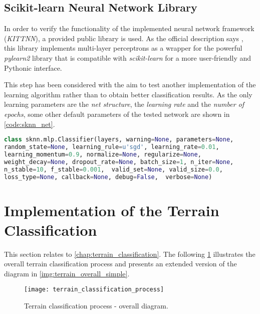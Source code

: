 \subsection*{Scikit-learn Neural Network Library} \label{ssec:sknn}
In order to verify the functionality of the implemented neural network framework (\textit{KITTNN}), a provided public library is used. As the official description says \citep{misc:sknn}, this library implements multi-layer perceptrons as a wrapper for the powerful \textit{pylearn2} library that is compatible with \textit{scikit-learn} for a more user-friendly and Pythonic interface.

This step has been considered with the aim to test another implementation of the learning algorithm rather than to obtain better classification results. As the only learning parameters are the \textit{net structure}, the \textit{learning rate} and the \textit{number of epochs}, some other default parameters of the tested network are shown in \cref{code:sknn_net}.

\begin{lstlisting}[language=Python, caption={SKNN classifier specification \citep{misc:sknn}}, label=code:sknn_net]
class sknn.mlp.Classifier(layers, warning=None, parameters=None, 
random_state=None, learning_rule=u'sgd', learning_rate=0.01, 
learning_momentum=0.9, normalize=None, regularize=None, 
weight_decay=None, dropout_rate=None, batch_size=1, n_iter=None, 
n_stable=10, f_stable=0.001,  valid_set=None, valid_size=0.0, 
loss_type=None, callback=None, debug=False,  verbose=None)
\end{lstlisting}

\newpage
\section{Implementation of the Terrain Classification} \label{app:sec:implementation_of_terrain_classification}
This section relates to \cref{chap:terrain_classification}. The following \cref{img:app:terrain_classification_process} illustrates the overall terrain classification process and presents an extended version of the diagram in \cref{img:terrain_overall_simple}.

\begin{figure}[H]
  \centering
  \texttt{[image: terrain\_classification\_process]}
  \caption{Terrain classification process - overall diagram.}
  \label{img:app:terrain_classification_process}
\end{figure}

